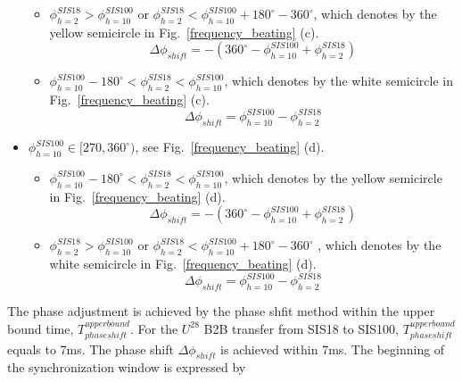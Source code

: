 \begin{itemize}
	\begin{itemize}
		\item $\phi_{h=2}^{SIS18} > \phi_{h=10}^{SIS100}$ or  $\phi_{h=2}^{SIS18} < \phi_{h=10}^{SIS100} +180^\circ - 360^\circ $, which denotes by the yellow semicircle in Fig.~\ref{frequency_beating} (c).  
    \begin{equation}			
\Delta \phi_{shift}=-(360^\circ - \phi_{h=10}^{SIS100}+ \phi_{h=2}^{SIS18})
    \end{equation}
    		\item $\phi_{h=10}^{SIS100}-180^\circ < \phi_{h=2}^{SIS18}< \phi_{h=10}^{SIS100}$, which denotes by the white semicircle in Fig.~\ref{frequency_beating} (c). 
    \begin{equation}			
\Delta \phi_{shift}=\phi_{h=10}^{SIS100}-\phi_{h=2}^{SIS18}
    \end{equation}
	\end{itemize}
    \item $\phi_{h=10}^{SIS100}\in [270,360^\circ)$, see Fig.~\ref{frequency_beating} (d).

	\begin{itemize}
		\item $\phi_{h=10}^{SIS100}-180^\circ < \phi_{h=2}^{SIS18}< \phi_{h=10}^{SIS100}$, which denotes by the yellow semicircle in Fig.~\ref{frequency_beating} (d).  
	    \begin{equation}		
\Delta \phi_{shift}=-(360^\circ - \phi_{h=10}^{SIS100}+ \phi_{h=2}^{SIS18})
    \end{equation}
    		\item $\phi_{h=2}^{SIS18} > \phi_{h=10}^{SIS100}$ or  $\phi_{h=2}^{SIS18} < \phi_{h=10}^{SIS100} +180^\circ - 360^\circ $ , which denotes by the white semicircle in Fig.~\ref{frequency_beating} (d). 
    \begin{equation}			
\Delta \phi_{shift}=\phi_{h=10}^{SIS100}-\phi_{h=2}^{SIS18}
    \end{equation}
	\end{itemize}
\end{itemize}

The phase adjustment is achieved by the phase shfit method within the upper bound time, $T_{phase\underline shift}^{upper\underline bound}$. For the $U^{28}$ B2B transfer from SIS18 to SIS100, $T_{phase\underline shift}^{upper\underline bound}$ equals to 7ms. The phase shift $\Delta \phi_{shift}$ is achieved within 7ms.  The beginning of the synchronization window is expressed by 

